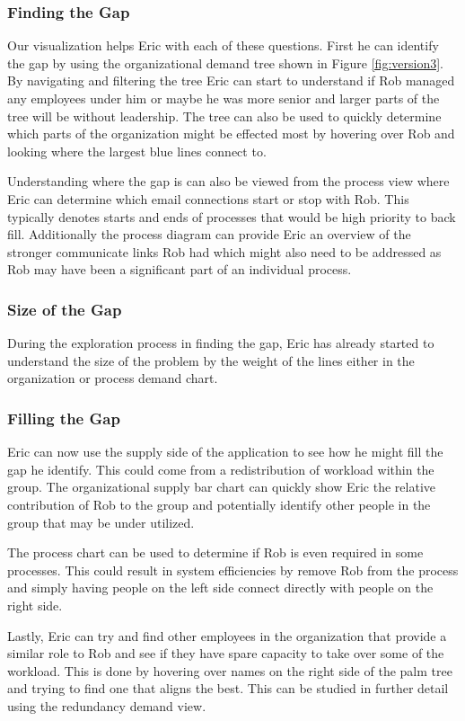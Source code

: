 \documentclass[journal]{vgtc}                %
\begin{document}
\subsubsection{Finding the Gap}
Our visualization helps Eric with each of these questions.  First he can identify the gap by using the organizational demand tree shown in Figure \ref{fig:version3}.  By navigating and filtering the tree Eric can start to understand if Rob managed any employees under him or maybe he was more senior and larger parts of the tree will be without leadership.  The tree can also be used to quickly determine which parts of the organization might be effected most by hovering over Rob and looking where the largest blue lines connect to.

Understanding where the gap is can also be viewed from the process view where Eric can determine which email connections start or stop with Rob.  This typically denotes starts and ends of processes that would be high priority to back fill.  Additionally the process diagram can provide Eric an overview of the stronger communicate links Rob had which might also need to be addressed as Rob may have been a significant part of an individual process.

\subsubsection{Size of the Gap}
During the exploration process in finding the gap, Eric has already started to understand the size of the problem by the weight of the lines either in the organization or process demand chart.

\subsubsection{Filling the Gap}
Eric can now use the supply side of the application to see how he might fill the gap he identify.  This could come from a redistribution of workload within the group.  The organizational supply bar chart can quickly show Eric the relative contribution of Rob to the group and potentially identify other people in the group that may be under utilized.

The process chart can be used to determine if Rob is even required in some processes.  This could result in system efficiencies by remove Rob from the process and simply having people on the left side connect directly with people on the right side.

Lastly, Eric can try and find other employees in the organization that provide a similar role to Rob and see if they have spare capacity to take over some of the workload.  This is done by hovering over names on the right side of the palm tree and trying to find one that aligns the best.  This can be studied in further detail using the redundancy demand view.
\end{document}
